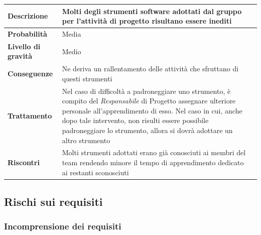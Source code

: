 \begin{center}
	
	\begin{tabular}{|>{\centering}m{4cm} ||>{\centering}m{8cm} |>{\centering\arraybackslash}m{0pt}@{}|}
		\hline
		\textbf{Descrizione} & Molti degli strumenti software adottati dal gruppo per l'attività di progetto risultano essere inediti & \\[2ex]
		\hline	
		\textbf{Probabilità} & Media & \\[1ex]
		\hline
		\textbf{Livello di gravità} & Medio & \\[1ex]
		\hline
		\textbf{Conseguenze} & Ne deriva un rallentamento delle attività
		che sfruttano di questi strumenti & \\[1ex]
		\hline
		\textbf{Trattamento} & Nel caso di difficoltà a padroneggiare uno
		strumento, è compito del  \emph{Responsabile}  di Progetto assegnare
		ulteriore personale all'apprendimento di esso. Nel caso in cui,
		anche dopo tale intervento, non risulti essere possibile
		padroneggiare lo strumento, allora si dovrà adottare un altro
		strumento & \\[1ex] 
		\hline
		\textbf{Riscontri} & Molti strumenti adottati erano già conosciuti ai membri del team rendendo minore il tempo di apprendimento dedicato ai restanti sconosciuti & \\[1ex]
		\hline
	\end{tabular}
	
\end{center}

\subsection{Rischi sui requisiti}
\subsubsection{Incomprensione dei requisiti}

